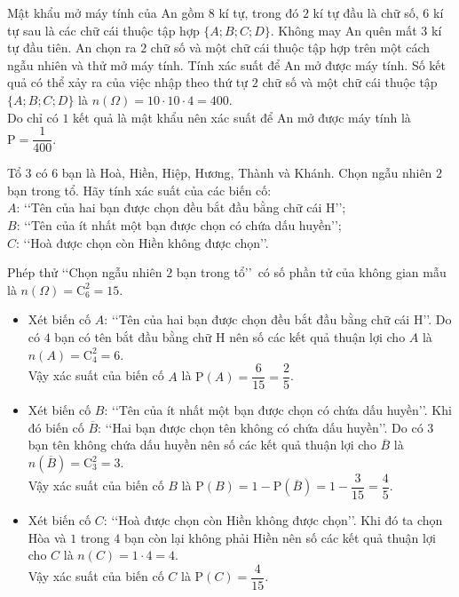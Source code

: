 \begin{bt}%
	Mật khẩu mở máy tính của An gồm $8$ kí tự, trong đó $2$ kí tự đầu là chữ số, $6$ kí tự sau là các chữ cái thuộc tập hợp $\{A;B;C;D\}$. Không may An quên mất $3$ kí tự đầu tiên. An chọn ra $2$ chữ số và một chữ cái thuộc tập hợp trên một cách ngẫu nhiên và thử mở máy tính. Tính xác suất để An mở được máy tính.
	\loigiai
	{Số kết quả có thể xảy ra của việc nhập theo thứ tự $2$ chữ số và một chữ cái thuộc tập $\{A;B;C;D\}$ là $n(\Omega)=10\cdot 10\cdot 4 = 400$.\\
		Do chỉ có $1$ kết quả là mật khẩu nên xác suất để An mở được máy tính là $\mathrm{P}=\dfrac{1}{400}$.}
\end{bt}

\begin{bt}%
	Tổ $3$ có $6$ bạn là Hoà, Hiền, Hiệp, Hương, Thành và Khánh. Chọn ngẫu nhiên $2$ bạn trong tổ. Hãy tính xác suất của các biến cố:\\
	$A$: \lq\lq Tên của hai bạn được chọn đều bắt đầu bằng chữ cái H\rq\rq;\\
	$B$: \lq\lq Tên của ít nhất một bạn được chọn có chứa dấu huyền\rq\rq;\\
	$C$: \lq\lq Hoà được chọn còn Hiền không được chọn\rq\rq.
	\loigiai
	{Phép thử \lq\lq Chọn ngẫu nhiên $2$ bạn trong tổ\rq\rq\, có số phần tử của không gian mẫu là $n(\Omega)=\mathrm{C}_6^2=15$.
		\begin{itemize}
			\item Xét biến cố $A$: \lq\lq Tên của hai bạn được chọn đều bắt đầu bằng chữ cái H\rq\rq. Do có $4$ bạn có tên bắt đầu bằng chữ H nên số các kết quả thuận lợi cho $A$ là $n(A)=\mathrm{C}_4^2=6$.\\
			Vậy xác suất của biến cố $A$ là $\mathrm{P}(A)=\dfrac{6}{15}=\dfrac{2}{5}$.
			\item Xét biến cố $B$: \lq\lq Tên của ít nhất một bạn được chọn có chứa dấu huyền\rq\rq. Khi đó biến cố $\overline{B}$: \lq\lq Hai bạn được chọn tên không có chứa dấu huyền\rq\rq. Do có $3$ bạn tên không chứa dấu huyền nên số các kết quả thuận lợi cho $\overline{B}$ là $n\left(\overline{B}\right)=\mathrm{C}_3^2=3$.\\
			Vậy xác suất của biến cố $B$ là $\mathrm{P}(B)=1-\mathrm{P}\left(\overline{B}\right) = 1-\dfrac{3}{15} = \dfrac{4}{5}$.
			\item Xét biến cố $C$: \lq\lq Hoà được chọn còn Hiền không được chọn\rq\rq. Khi đó ta chọn Hòa và $1$ trong $4$ bạn còn lại không phải Hiền nên số các kết quả thuận lợi cho $C$ là $n(C)=1\cdot4=4$.\\
			Vậy xác suất của biến cố $C$ là $\mathrm{P}(C)=\dfrac{4}{15}$.
	\end{itemize}}
\end{bt}

